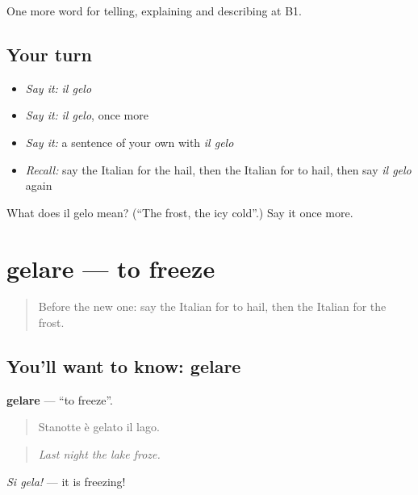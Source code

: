 \begin{grammarlens}[title={What you've built}]
One more word for telling, explaining and describing at B1.
\end{grammarlens}

\subsection*{Your turn}
\begin{itemize}
\raggedright
  \item \emph{Say it:} \emph{il gelo}
  \item \emph{Say it:} \emph{il gelo}, once more
  \item \emph{Say it:} a sentence of your own with \emph{il gelo}
  \item \emph{Recall:} say the Italian for the hail, then the Italian for to hail, then say \emph{il gelo} again
\end{itemize}

\begin{tcolorbox}[breakable,colback=teal!4,colframe=teal!35!black,title={Before you move on}]
What does il gelo mean? (\textquotedblleft{}The frost, the icy cold\textquotedblright{}.) Say it once more.
\end{tcolorbox}
\section[gelare]{gelare — to freeze}

\label{lesson:IT-C468-gelare}



\begin{quote}
Before the new one: say the Italian for to hail, then the Italian for the frost.
\end{quote}

\subsection*{You'll want to know: gelare}
\textbf{gelare} — \textquotedblleft{}to freeze\textquotedblright{}.

\begin{quote}
Stanotte è gelato il lago.
\end{quote}

\begin{quote}
\emph{Last night the lake froze.}
\end{quote}

\emph{Si gela!} — it is freezing!

